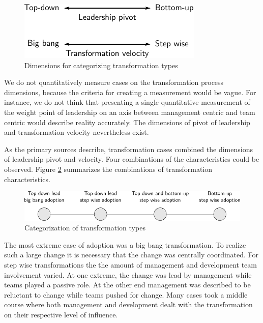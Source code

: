 \documentclass[preprint,authoryear,12pt]{elsarticle}
\begin{document}
\begin{figure}[h]
  \begin{center}
    \includegraphics{graphics/transformation_dimensions.pdf}
    \caption{Dimensions for categorizing transformation types}
    \label{fig:transformation_dimensions}
  \end{center}
\end{figure}

We do not quantitatively measure cases on the transformation process dimensions,
because the criteria for creating a measurement would be vague. For instance, we
do not think that presenting a single quantitative measurement of the weight
point of leadership on an axis between management centric and team centric would
describe reality accurately. The dimensions of pivot of leadership and
transformation velocity nevertheless exist.

As the primary sources describe, transformation cases combined the dimensions of
leadership pivot and velocity. Four combinations of the characteristics could be
observed. Figure \ref{fig:transformation_types} summarizes the combinations of
transformation characteristics.

\begin{figure}[h]
  \begin{center}
    \includegraphics[width=1\textwidth]{graphics/transformation_process.pdf}
    \caption{Categorization of transformation types}
    \label{fig:transformation_types}
  \end{center}
\end{figure}

The most extreme case of adoption was a big bang transformation. To realize such
a large change it is necessary that the change was centrally coordinated.
For step wise transformations the the amount of management and development team
involvement varied. At one extreme, the change was lead by management while
teams played a passive role. At the other end management was described to be
reluctant to change while teams pushed for change. Many cases took a middle
course where both management and development dealt with the transformation on
their respective level of influence.
\end{document}
